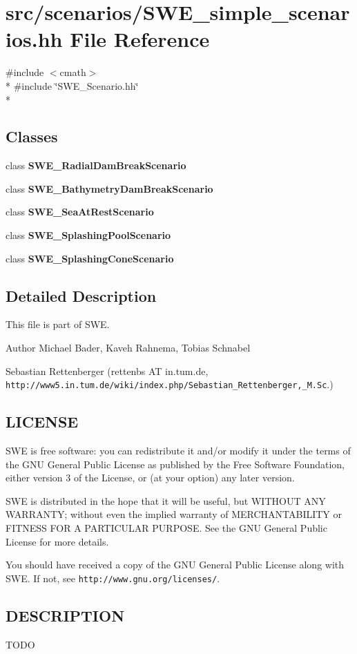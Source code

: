 \section{src/scenarios/\-S\-W\-E\-\_\-simple\-\_\-scenarios.hh File Reference}
\label{SWE__simple__scenarios_8hh}
{\ttfamily \#include $<$cmath$>$}\\*
{\ttfamily \#include \char`\"{}S\-W\-E\-\_\-\-Scenario.\-hh\char`\"{}}\\*
\subsection*{Classes}
\begin{DoxyCompactItemize}
\item 
class {\bf S\-W\-E\-\_\-\-Radial\-Dam\-Break\-Scenario}
\item 
class {\bf S\-W\-E\-\_\-\-Bathymetry\-Dam\-Break\-Scenario}
\item 
class {\bf S\-W\-E\-\_\-\-Sea\-At\-Rest\-Scenario}
\item 
class {\bf S\-W\-E\-\_\-\-Splashing\-Pool\-Scenario}
\item 
class {\bf S\-W\-E\-\_\-\-Splashing\-Cone\-Scenario}
\end{DoxyCompactItemize}


\subsection{Detailed Description}
This file is part of S\-W\-E.

\begin{DoxyAuthor}{Author}
Michael Bader, Kaveh Rahnema, Tobias Schnabel 

Sebastian Rettenberger (rettenbs A\-T in.\-tum.\-de, {\tt http\-://www5.\-in.\-tum.\-de/wiki/index.\-php/\-Sebastian\-\_\-\-Rettenberger,\-\_\-\-M.\-Sc}.)
\end{DoxyAuthor}
\subsection{L\-I\-C\-E\-N\-S\-E}\label{Writer_8hh_LICENSE}
S\-W\-E is free software\-: you can redistribute it and/or modify it under the terms of the G\-N\-U General Public License as published by the Free Software Foundation, either version 3 of the License, or (at your option) any later version.

S\-W\-E is distributed in the hope that it will be useful, but W\-I\-T\-H\-O\-U\-T A\-N\-Y W\-A\-R\-R\-A\-N\-T\-Y; without even the implied warranty of M\-E\-R\-C\-H\-A\-N\-T\-A\-B\-I\-L\-I\-T\-Y or F\-I\-T\-N\-E\-S\-S F\-O\-R A P\-A\-R\-T\-I\-C\-U\-L\-A\-R P\-U\-R\-P\-O\-S\-E. See the G\-N\-U General Public License for more details.

You should have received a copy of the G\-N\-U General Public License along with S\-W\-E. If not, see {\tt http\-://www.\-gnu.\-org/licenses/}.\subsection{D\-E\-S\-C\-R\-I\-P\-T\-I\-O\-N}\label{NetCdfWriter_8hh_DESCRIPTION}
T\-O\-D\-O 